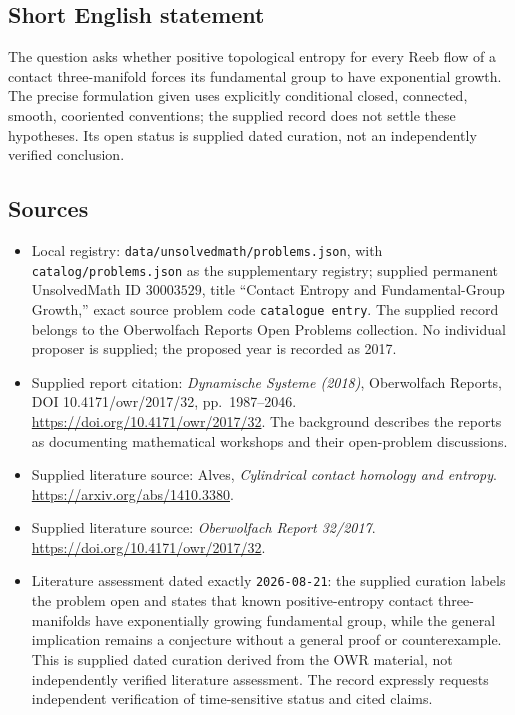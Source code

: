 \documentclass[11pt]{article}
\begin{document}
\subsection{Short English statement}
The question asks whether positive topological entropy for every Reeb flow of a contact three-manifold forces its fundamental group to have exponential growth. The precise formulation given uses explicitly conditional closed, connected, smooth, cooriented conventions; the supplied record does not settle these hypotheses. Its open status is supplied dated curation, not an independently verified conclusion.
\subsection{Sources}
\begin{itemize}
\item Local registry: \texttt{data/unsolvedmath/problems.json}, with \texttt{catalog/problems.json} as the supplementary registry; supplied permanent UnsolvedMath ID \(30003529\), title ``Contact Entropy and Fundamental-Group Growth,'' exact source problem code \texttt{catalogue entry}. The supplied record belongs to the Oberwolfach Reports Open Problems collection. No individual proposer is supplied; the proposed year is recorded as 2017.
\item Supplied report citation: \emph{Dynamische Systeme (2018)}, Oberwolfach Reports, DOI 10.4171/owr/2017/32, pp.\ 1987--2046. \url{https://doi.org/10.4171/owr/2017/32}. The background describes the reports as documenting mathematical workshops and their open-problem discussions.
\item Supplied literature source: Alves, \emph{Cylindrical contact homology and entropy}. \url{https://arxiv.org/abs/1410.3380}.
\item Supplied literature source: \emph{Oberwolfach Report 32/2017}. \url{https://doi.org/10.4171/owr/2017/32}.
\item Literature assessment dated exactly \texttt{2026-08-21}: the supplied curation labels the problem open and states that known positive-entropy contact three-manifolds have exponentially growing fundamental group, while the general implication remains a conjecture without a general proof or counterexample. This is supplied dated curation derived from the OWR material, not independently verified literature assessment. The record expressly requests independent verification of time-sensitive status and cited claims.
\end{itemize}
\end{document}
